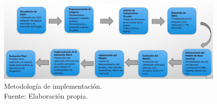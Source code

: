 \begin{figure}[H]
	\begin{center}
		\includegraphics[width=1.00\textwidth]{3/figures/1.jpeg}
		\caption[Metodología de implementación]{Metodología de implementación. \\
		Fuente: Elaboración propia.}
		\label{3:fig301}
	\end{center}
\end{figure}




